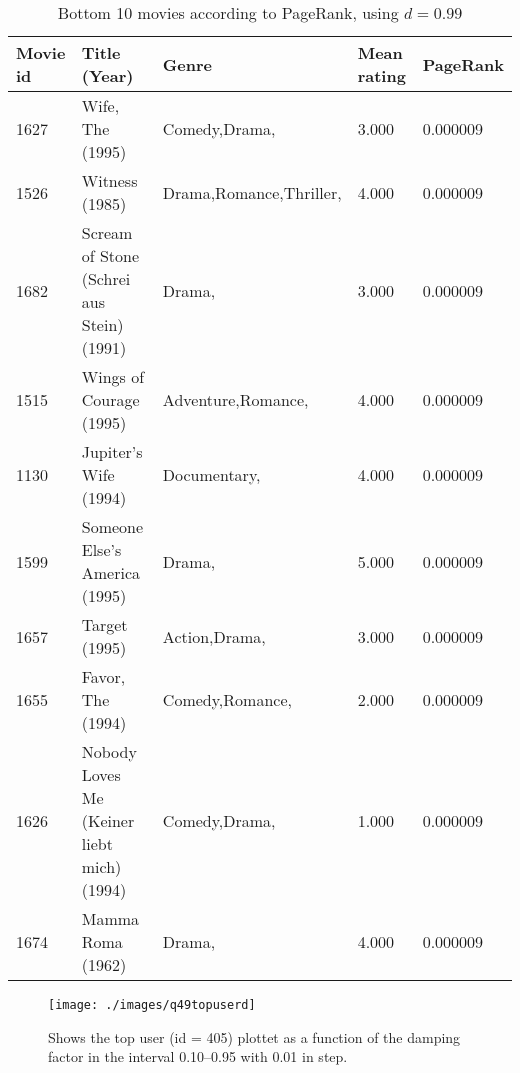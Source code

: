 \begin{table}[!htbp]
\hspace{-2cm}
\begin{tabular}{lllll}
Movie id & Title (Year) & Genre & Mean rating & PageRank \\
\hline
1627 & Wife, The (1995) & Comedy,Drama, & 3.000 & 0.000009 \\
1526 & Witness (1985) & Drama,Romance,Thriller, & 4.000 & 0.000009 \\
1682 & Scream of Stone (Schrei aus Stein) (1991) & Drama, & 3.000 & 0.000009 \\
1515 & Wings of Courage (1995) & Adventure,Romance, & 4.000 & 0.000009 \\
1130 & Jupiter's Wife (1994) & Documentary, & 4.000 & 0.000009 \\
1599 & Someone Else's America (1995) & Drama, & 5.000 & 0.000009 \\
1657 & Target (1995) & Action,Drama, & 3.000 & 0.000009 \\
1655 & Favor, The (1994) & Comedy,Romance, & 2.000 & 0.000009 \\
1626 & Nobody Loves Me (Keiner liebt mich) (1994) & Comedy,Drama, & 1.000 & 0.000009 \\
1674 & Mamma Roma (1962) & Drama, & 4.000 & 0.000009 \\
\end{tabular}
\caption{Bottom 10 movies according to PageRank, using $d = 0.99$}
\label{tab:q49bottom10md99}
\end{table}

\begin{figure}[!htbp]
  \centering \texttt{[image: ./images/q49topuserd]}
  \caption{Shows the top user (id = 405) plottet as a function of the
    damping factor in the interval 0.10--0.95 with 0.01 in step.}
  \label{fig:q49topuserd}
\end{figure}
